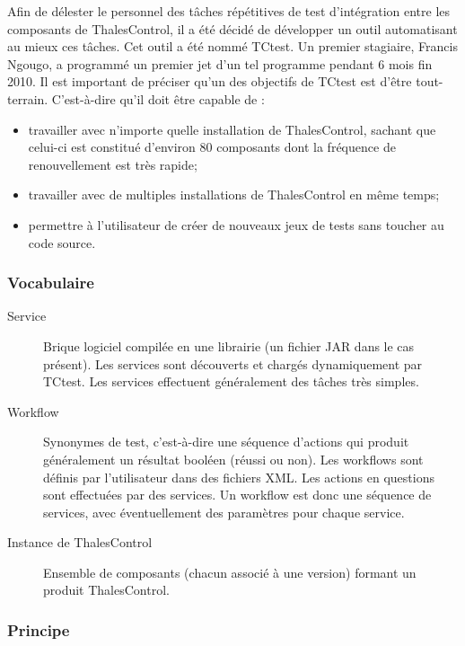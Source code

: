 Afin de délester le personnel des tâches répétitives de test d'intégration 
entre les composants de ThalesControl, il a été décidé de développer un outil 
automatisant au mieux ces tâches. Cet outil a été nommé TCtest. Un premier 
stagiaire, Francis Ngougo, 
a programmé un premier jet d'un tel programme pendant 6 mois fin 2010.
Il est important de préciser qu'un des objectifs 
de TCtest est d'être tout-terrain. C'est-à-dire qu'il doit être capable de :
\begin{itemize}
	\item{travailler avec n'importe quelle installation de ThalesControl, sachant que 
	celui-ci est constitué d'environ 80 composants dont la fréquence de renouvellement 
	est très rapide;}
	\item{travailler avec de multiples installations de ThalesControl en même 
	temps;}
	\item{permettre à l'utilisateur de créer de nouveaux jeux de tests sans 
	toucher au code source.}
\end{itemize}

\subsubsection{Vocabulaire}
\label{Voc}

\begin{description}
	\item[Service] Brique logiciel compilée en une librairie (un fichier JAR 
	dans le cas présent). Les services sont découverts et chargés dynamiquement 
	par TCtest. Les services effectuent généralement des tâches très simples.
	\item[Workflow] Synonymes de test, c'est-à-dire une séquence d'actions qui 
	produit généralement un résultat booléen (réussi ou non). Les workflows 
	sont définis par l'utilisateur dans des fichiers XML. Les actions en 
	questions sont effectuées par des services. Un workflow est donc une 
	séquence de services, avec éventuellement des paramètres pour chaque 
	service.
	\item[Instance de ThalesControl] Ensemble de composants (chacun associé
	à une version) formant un produit ThalesControl.
\end{description}

\subsubsection{Principe}

